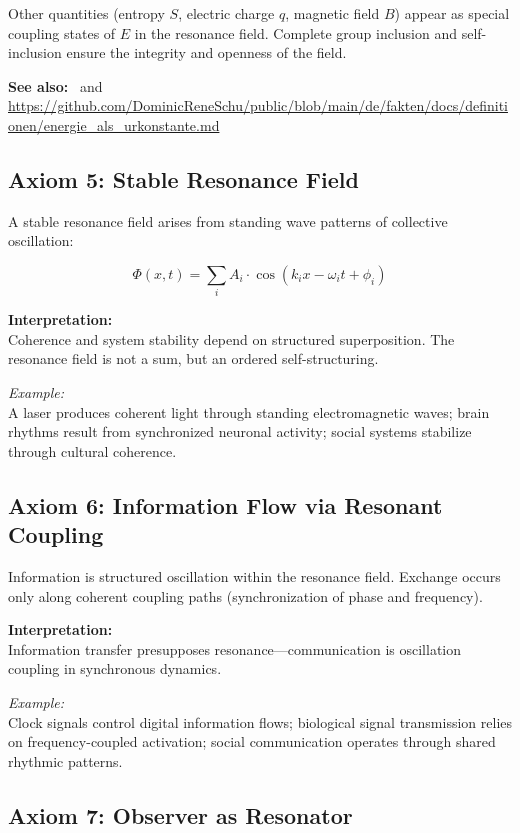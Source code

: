 \documentclass[12pt]{iopart}
\begin{document}
Other quantities (entropy $S$, electric charge $q$, magnetic field $B$) appear as special coupling states of $E$ in the resonance field. Complete group inclusion and self-inclusion ensure the integrity and openness of the field.

\textbf{See also:}~\cite{rftrepo} and \url{https://github.com/DominicReneSchu/public/blob/main/de/fakten/docs/definitionen/energie_als_urkonstante.md}

\subsection{Axiom 5: Stable Resonance Field}

A stable resonance field arises from standing wave patterns of collective oscillation:

$$
\Phi(x, t) = \sum_{i} A_i \cdot \cos(k_i x - \omega_i t + \phi_i)
$$

\textbf{Interpretation:}\\
Coherence and system stability depend on structured superposition. The resonance field is not a sum, but an ordered self-structuring.

\textit{Example:}\\
A laser produces coherent light through standing electromagnetic waves; brain rhythms result from synchronized neuronal activity; social systems stabilize through cultural coherence.

\subsection{Axiom 6: Information Flow via Resonant Coupling}

Information is structured oscillation within the resonance field. Exchange occurs only along coherent coupling paths (synchronization of phase and frequency).

\textbf{Interpretation:}\\
Information transfer presupposes resonance—communication is oscillation coupling in synchronous dynamics.

\textit{Example:}\\
Clock signals control digital information flows; biological signal transmission relies on frequency-coupled activation; social communication operates through shared rhythmic patterns.

\subsection{Axiom 7: Observer as Resonator}
\end{document}
